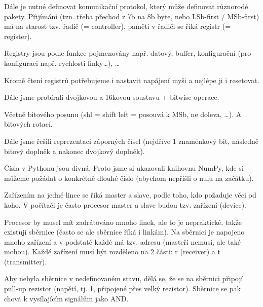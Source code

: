 \documentclass[12pt]{article}					%
\begin{document}
        \begin{definice}[Řadič]
            Dále je nutné definovat komunikační protokol, který může definovat různorodé pakety. Přijímání (tzn. třeba přechod z 7b na 8b byte, nebo LSb-first / MSb-first) má na starost tzv. řadič (= controller), paměti v řadiči se říká registr (= register).

            Registry jsou podle funkce pojmenovány např. datový, buffer, konfigurační (pro konfiguraci např. rychlosti linky…), …
        \end{definice}

        
        \begin{upozorneni}
            Kromě čtení registrů potřebujeme i nastavit napájení myši a nejlépe ji i resetovat.
        \end{upozorneni}

        \begin{poznamka}
            Dále jsme probírali dvojkovou a 16kovou soustavu + bitwise operace.
        \end{poznamka}


        \begin{poznamka}
            Včetně bitového posunu (shl = shift left = posouvá k MSb, ne doleva, …). A bitových rotací.
        \end{poznamka}

        \begin{poznamka}
            Dále jsme řešili reprezentaci záporných čísel (nejdříve 1 znaménkový bit, následně bitový doplněk a nakonec dvojkový doplněk).
        \end{poznamka}

        \begin{upozorneni}
            Čísla v Pythonu jsou divná. Proto jsme si ukazovali knihovnu NumPy, kde si můžeme požádat o konkrétně dlouhé číslo (abychom nepřišli o nulu na začátku).
        \end{upozorneni}


        \begin{definice}
            Zařízením na jedné lince se říká master a slave, podle toho, kdo požaduje věci od koho. V počítači je často procesor master a slave budou tzv. zařízení (device).
        \end{definice}

        \begin{definice}[Multigroup linka = bus (sběrnice)]
            Procesor by musel mít zadrátováno mnoho linek, ale to je nepraktické, takže existují sběrnice (často se ale sběrnice říká i linkám). Na sběrnici je napojeno mnoho zařízení a v podstatě každé má tzv. adresu (masteři nemusí, ale také mohou). Každé zařízení musí být rozděleno na 2 části: r (receiver) a t (transmitter).

            Aby nebyla sběrnice v nedefinovaném stavu, dělá se, že se na sběrnici připojí pull-up rezistor (napětí, tj. 1, připojené přes velký rezistor). Sběrnice se pak chová k vysílajícím signálům jako AND.
        \end{definice}
\end{document}

